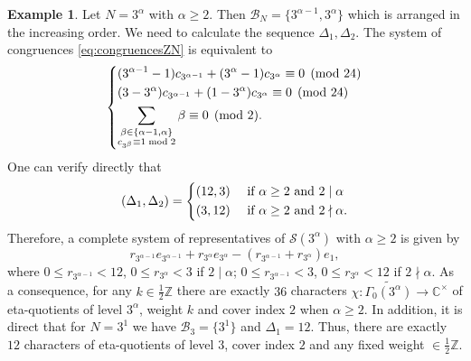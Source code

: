 \documentclass[12pt]{amsart}
\numberwithin{equation}{section}
\theoremstyle{plain}
\theoremstyle{definition}
\newtheorem{examp}[thm]{Example}
\theoremstyle{remark}
\newcommand\twoscript[2]{\substack{{#1} \\ {#2}}}
\newcommand\numZ{\mathbb{Z}}
\newcommand\numC{\mathbb{C}}
\begin{document}
\begin{examp}
\label{examp:classifyChar3}
Let $N=3^\alpha$ with $\alpha \geq2$. Then $\mathscr{B}_N=\{3^{\alpha-1},3^{\alpha}\}$ which is arranged in the increasing order. We need to calculate the sequence $\Delta_1,\Delta_2$. The system of congruences \eqref{eq:congruencesZN} is equivalent to
\begin{equation*}
\begin{dcases}
(3^{\alpha-1}-1)c_{3^{\alpha-1}}+(3^{\alpha}-1)c_{3^{\alpha}}\equiv0\pmod{24}\\
(3-3^{\alpha})c_{3^{\alpha-1}}+(1-3^{\alpha})c_{3^{\alpha}}\equiv0\pmod{24}\\
\sum_{\twoscript{\beta\in\{\alpha-1,\alpha\}}{c_{3^\beta}\equiv1\bmod 2}}\beta\equiv0\pmod{2}.
\end{dcases}
\end{equation*}
One can verify directly that
\begin{equation*}
(\Delta_1,\Delta_2)=\begin{dcases}
(12,3)  &\text{ if }\alpha\geq2\text{ and }2\mid\alpha\\
(3,12)  &\text{ if }\alpha\geq2\text{ and }2\nmid\alpha.
\end{dcases}
\end{equation*}
Therefore, a complete system of representatives of $\mathscr{S}(3^\alpha)$ with $\alpha\geq2$ is given by
\begin{equation*}
r_{3^{\alpha-1}}e_{3^{\alpha-1}}+r_{3^{\alpha}}e_{3^{\alpha}}-(r_{3^{\alpha-1}}+r_{3^{\alpha}})e_1,
\end{equation*}
where $0\leq r_{3^{\alpha-1}}<12$, $0\leq r_{3^{\alpha}}<3$ if $2\mid\alpha$; $0\leq r_{3^{\alpha-1}}<3$, $0\leq r_{3^{\alpha}}<12$ if $2\nmid\alpha$. As a consequence, for any $k\in\frac{1}{2}\numZ$ there are exactly $36$ characters $\chi\colon\widetilde{\Gamma_0(3^\alpha)}\to\numC^\times$ of eta-quotients of level $3^\alpha$, weight $k$ and cover index $2$ when $\alpha\geq2$. In addition, it is direct that for $N=3^1$ we have $\mathscr{B}_{3}=\{3^1\}$ and $\Delta_1=12$. Thus, there are exactly $12$ characters of eta-quotients of level $3$, cover index $2$ and any fixed weight $\in\frac{1}{2}\numZ$.
\end{examp}
\end{document}
